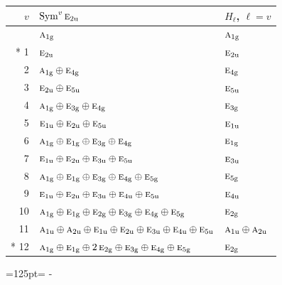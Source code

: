 \documentclass[10pt,a4paper]{article}
\newcommand{\needspace}[1]{\par\penalty-100\begingroup\dimen0=#1\relax\dimen2=\pagegoal
  \advance\dimen2-\pagetotal\ifdim\dimen0>\dimen2\relax\ifdim\dimen2>0pt\vfil\break\fi\fi
  \endgroup}
\numberwithin{equation}{section}
\newcommand{\irr}[1]{\text{\normalfont\scshape #1}}
\newcommand{\ptag}[1]{\mathrm{#1}}
\begin{document}
{\small\begin{longtable}{@{}rll@{}}\toprule
$v$ & $\operatorname{Sym}^{v}\irr{e}_{2\ptag{u}}$ & $H_\ell$, $\ell = v$\\\midrule\endhead
\bottomrule\endfoot\endlastfoot
0 & $\irr{a}_{1\ptag{g}}$ & $\irr{a}_{1\ptag{g}}$\\*
1 & $\irr{e}_{2\ptag{u}}$ & $\irr{e}_{2\ptag{u}}$\\
2 & $\irr{a}_{1\ptag{g}} \oplus \irr{e}_{4\ptag{g}}$ & $\irr{e}_{4\ptag{g}}$\\
3 & $\irr{e}_{2\ptag{u}} \oplus \irr{e}_{5\ptag{u}}$ & $\irr{e}_{5\ptag{u}}$\\
4 & $\irr{a}_{1\ptag{g}} \oplus \irr{e}_{3\ptag{g}} \oplus \irr{e}_{4\ptag{g}}$ & $\irr{e}_{3\ptag{g}}$\\
5 & $\irr{e}_{1\ptag{u}} \oplus \irr{e}_{2\ptag{u}} \oplus \irr{e}_{5\ptag{u}}$ & $\irr{e}_{1\ptag{u}}$\\
6 & $\irr{a}_{1\ptag{g}} \oplus \irr{e}_{1\ptag{g}} \oplus \irr{e}_{3\ptag{g}} \oplus \irr{e}_{4\ptag{g}}$ & $\irr{e}_{1\ptag{g}}$\\
7 & $\irr{e}_{1\ptag{u}} \oplus \irr{e}_{2\ptag{u}} \oplus \irr{e}_{3\ptag{u}} \oplus \irr{e}_{5\ptag{u}}$ & $\irr{e}_{3\ptag{u}}$\\
8 & $\irr{a}_{1\ptag{g}} \oplus \irr{e}_{1\ptag{g}} \oplus \irr{e}_{3\ptag{g}} \oplus \irr{e}_{4\ptag{g}} \oplus \irr{e}_{5\ptag{g}}$ & $\irr{e}_{5\ptag{g}}$\\
9 & $\irr{e}_{1\ptag{u}} \oplus \irr{e}_{2\ptag{u}} \oplus \irr{e}_{3\ptag{u}} \oplus \irr{e}_{4\ptag{u}} \oplus \irr{e}_{5\ptag{u}}$ & $\irr{e}_{4\ptag{u}}$\\
10 & $\irr{a}_{1\ptag{g}} \oplus \irr{e}_{1\ptag{g}} \oplus \irr{e}_{2\ptag{g}} \oplus \irr{e}_{3\ptag{g}} \oplus \irr{e}_{4\ptag{g}} \oplus \irr{e}_{5\ptag{g}}$ & $\irr{e}_{2\ptag{g}}$\\
11 & $\irr{a}_{1\ptag{u}} \oplus \irr{a}_{2\ptag{u}} \oplus \irr{e}_{1\ptag{u}} \oplus \irr{e}_{2\ptag{u}} \oplus \irr{e}_{3\ptag{u}} \oplus \irr{e}_{4\ptag{u}} \oplus \irr{e}_{5\ptag{u}}$ & $\irr{a}_{1\ptag{u}} \oplus \irr{a}_{2\ptag{u}}$\\*
12 & $\irr{a}_{1\ptag{g}} \oplus \irr{e}_{1\ptag{g}} \oplus 2\,\irr{e}_{2\ptag{g}} \oplus \irr{e}_{3\ptag{g}} \oplus \irr{e}_{4\ptag{g}} \oplus \irr{e}_{5\ptag{g}}$ & $\irr{e}_{2\ptag{g}}$\\
\bottomrule\end{longtable}}
\needspace{125pt}
\end{document}
